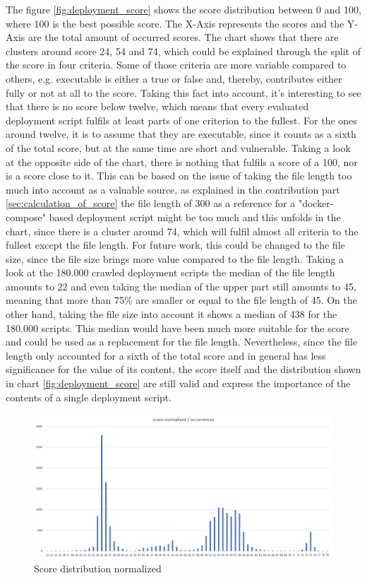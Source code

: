 The figure \ref{fig:deployment_score} shows the score distribution between 0 and 100, where 100 is the best possible score. The X-Axis represents the scores and the Y-Axis are the total amount of occurred scores. The chart shows that there are clusters around score 24, 54 and 74, which could be explained through the split of the score in four criteria. Some of those criteria are more variable compared to others, e.g. executable is either a true or false and, thereby, contributes either fully or not at all to the score. Taking this fact into account, it's interesting to see that there is no score below twelve, which means that every evaluated deployment script fulfils at least parts of one criterion to the fullest. For the ones around twelve, it is to assume that they are executable, since it counts as a sixth of the total score, but at the same time are short and vulnerable. Taking a look at the opposite side of the chart, there is nothing that fulfils a score of a 100, nor is a score close to it. This can be based on the issue of taking the file length too much into account as a valuable source, as explained in the contribution part \ref{sec:calculation_of_score} the file length of 300 as a reference for a "docker-compose" based deployment script might be too much and this unfolds in the chart, since there is a cluster around 74, which will fulfil almost all criteria to the fullest except the file length. For future work, this could be changed to the file size, since the file size brings more value compared to the file length. Taking a look at the 180.000 crawled deployment scripts the median of the file length amounts to 22 and even taking the median of the upper part still amounts to 45, meaning that more than 75\% are smaller or equal to the file length of 45. On the other hand, taking the file size into account it shows a median of 438 for the 180.000 scripts. This median would have been much more suitable for the score and could be used as a replacement for the file length. Nevertheless, since the file length only accounted for a sixth of the total score and in general has less significance for the value of its content, the score itself and the distribution shown in chart \ref{fig:deployment_score} are still valid and express the importance of the contents of a single deployment script.

\begin{figure}[H]
    \centering
    \includegraphics[scale=0.5]{graphics/deployment_score_normalized.png}
    \caption{Score distribution normalized}
    \label{fig:deployment_score_normalized}
\end{figure}

